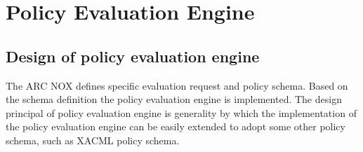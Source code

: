 \documentclass{article}                            %
\begin{document}



\section{Policy Evaluation Engine} %
\label{sec:policy_eval}

\subsection{Design of policy evaluation engine} %
\label{subsec:design_policyengine}

The ARC NOX defines specific evaluation request and policy schema. Based on the schema definition the policy evaluation engine is implemented. The design principal of policy evaluation engine is generality by which the implementation of the policy evaluation engine can be easily extended to adopt some other policy schema, such as XACML policy schema.

\begin{figure}[ht]
\end{figure}
\end{document}
